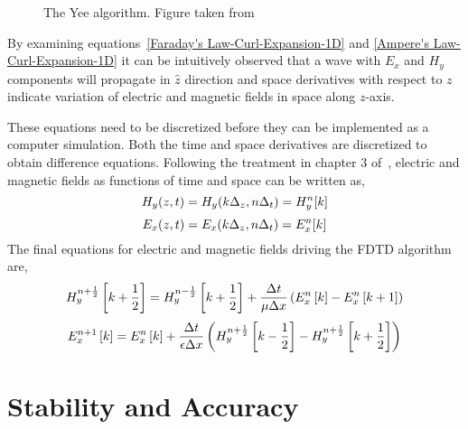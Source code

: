 \documentclass{report}
\begin{document}
\begin{figure}[here]
\centering
\caption{The Yee algorithm. Figure taken from~\cite{JBSchneiderUFDTD}}
\label{Algorithm}
\end{figure}

By examining equations~\ref{Faraday's Law-Curl-Expansion-1D} and \ref{Ampere's Law-Curl-Expansion-1D} it can be intuitively observed that a wave with $E_x$ and $H_y$ components will propagate in $\hat{z}$ direction and space derivatives with respect to $z$ indicate variation of electric and magnetic fields in space along $z$-axis.

These equations need to be discretized before they can be implemented as a computer simulation. Both the time and space derivatives are discretized to obtain difference equations. Following the treatment in chapter 3 of~\cite{JBSchneiderUFDTD}, electric and magnetic fields as functions of time and space can be written as,
\begin{equation}
\centering
H_y (z,t)=H_y (k\Delta _z,n\Delta _t)=H^n_y[k]
\label{Hy-of-z_and_t}
\end{equation}
\begin{equation}
\centering
E_x (z,t)=E_x (k\Delta _z,n\Delta _t)=E^n_x[k]
\label{Ex-of-z_and_t}
\end{equation}
The final equations for electric and magnetic fields driving the FDTD algorithm are,
\begin{equation}
\centering
H^{n+\frac{1}{2}}_y \left[k+\frac{1}{2}\right]=H^{n-\frac{1}{2}}_y \left[k+\frac{1}{2}\right] + \dfrac{\Delta t}{\mu \Delta x} \left( E^{n}_x \left[k\right] - E^{n}_x \left[k+1\right] \right)
\label{Hy-1D-Simple-FDTD-Driver}
\end{equation}
\begin{equation}
\centering
E^{n+1}_x \left[k\right]=E^{n}_x \left[k\right] + \dfrac{\Delta t}{\epsilon \Delta x} \left( H^{n+\frac{1}{2}}_y \left[k-\frac{1}{2}\right] - H^{n+\frac{1}{2}}_y \left[k+\frac{1}{2}\right] \right)
\label{Ex-1D-Simple-FDTD-Driver}
\end{equation}

\section{Stability and Accuracy}
\end{document}
